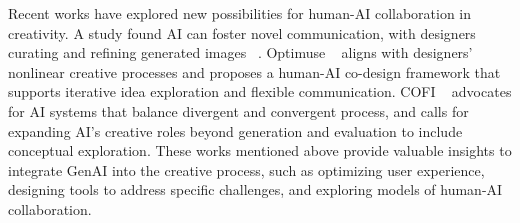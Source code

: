 Recent works have explored new possibilities for human-AI collaboration in creativity. A study found AI can foster novel communication, with designers curating and refining generated images ~\cite{DesigningChiou2023}. Optimuse ~\cite{OptiMuse} aligns with designers' nonlinear creative processes and proposes a human-AI co-design framework that supports iterative idea exploration and flexible communication. COFI ~\cite{rezwana2023designing} advocates for AI systems that balance divergent and convergent process, and calls for expanding AI's creative roles beyond generation and evaluation to include conceptual exploration. These works mentioned above provide valuable insights to integrate GenAI into the creative process, such as optimizing user experience, designing tools to address specific challenges, and exploring models of human-AI collaboration.










